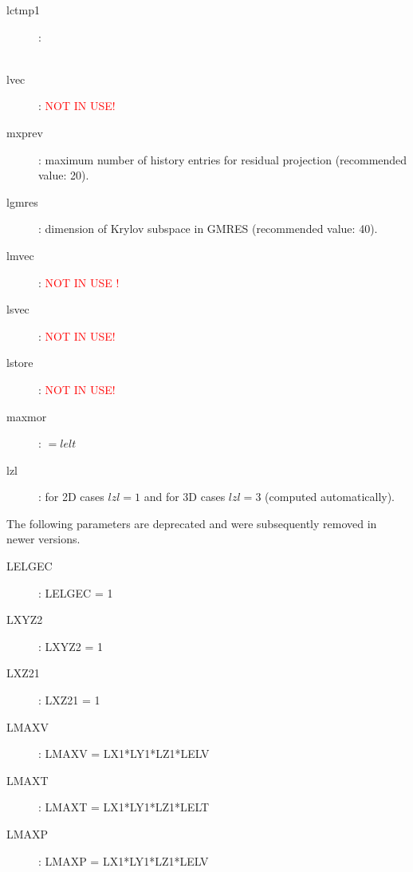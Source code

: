 \begin{description}
\item [lctmp1] : \\
\\
\item [lvec] : {\textcolor{red}{NOT IN USE!}}
\item [mxprev]: maximum number of history entries for residual projection (recommended value: 20).
\item [lgmres]: dimension of Krylov subspace in GMRES (recommended value: 40).
\item [lmvec] : {\textcolor{red}{NOT IN USE !}}
\item [lsvec] : {\textcolor{red}{NOT IN USE!}}
\item [lstore] : {\textcolor{red}{NOT IN USE!}}
\item [maxmor] : $=lelt$
\item [lzl]: for 2D cases $lzl=1$ and for 3D cases $lzl=3$ (computed automatically).
\end{description}

The following parameters are deprecated and were subsequently removed in newer versions.
\begin{description}
\item [LELGEC] : LELGEC = 1 
\item [LXYZ2] : LXYZ2 = 1 
\item [LXZ21] : LXZ21 = 1 
\item [LMAXV] : LMAXV = LX1*LY1*LZ1*LELV 
\item [LMAXT] : LMAXT = LX1*LY1*LZ1*LELT 
\item [LMAXP] : LMAXP = LX1*LY1*LZ1*LELV 
\end{description}

